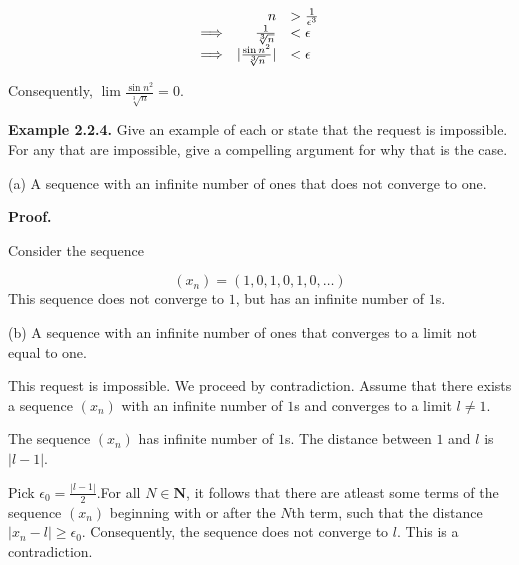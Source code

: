 \documentclass[10pt]{article}
\begin{document}
\begin{equation*}
\begin{array}{ c r l }
 & n &  >\frac{1}{\epsilon ^{3}}\\
\Longrightarrow  & \frac{1}{\sqrt[3] n} & < \epsilon \\
\Longrightarrow  & |\frac{\sin n^{2}}{\sqrt[3] n} | & < \epsilon 
\end{array}
\end{equation*}


Consequently, $\displaystyle \lim \frac{\sin n^{2}}{\sqrt[3] n} =0$.



\textbf{Example 2.2.4.} Give an example of each or state that the request is impossible. For any that are impossible, give a compelling argument for why that is the case.



(a) A sequence with an infinite number of ones that does not converge to one.



\textbf{Proof.}



Consider the sequence 


\begin{equation*}
( x_{n}) =( 1,0,1,0,1,0,\dotsc )
\end{equation*}
This sequence does not converge to $\displaystyle 1$, but has an infinite number of $\displaystyle 1$s.



(b) A sequence with an infinite number of ones that converges to a limit not equal to one.



This request is impossible. We proceed by contradiction. Assume that there exists a sequence $\displaystyle ( x_{n})$ with an infinite number of $\displaystyle 1$s and converges to a limit $\displaystyle l\neq 1$. 



The sequence $\displaystyle ( x_{n})$ has infinite number of $\displaystyle 1$s. The distance between $\displaystyle 1$ and $\displaystyle l$ is $\displaystyle |l-1|$. 



Pick $\displaystyle \epsilon _{0} =\frac{|l-1|}{2}$.For all $\displaystyle N\in \mathbf{N}$, it follows that there are atleast some terms of the sequence $\displaystyle ( x_{n})$ beginning with or after the $\displaystyle N$th term, such that the distance $\displaystyle |x_{n} -l|\geq \epsilon _{0}$. Consequently, the sequence does not converge to $\displaystyle l$. This is a contradiction.
\end{document}
